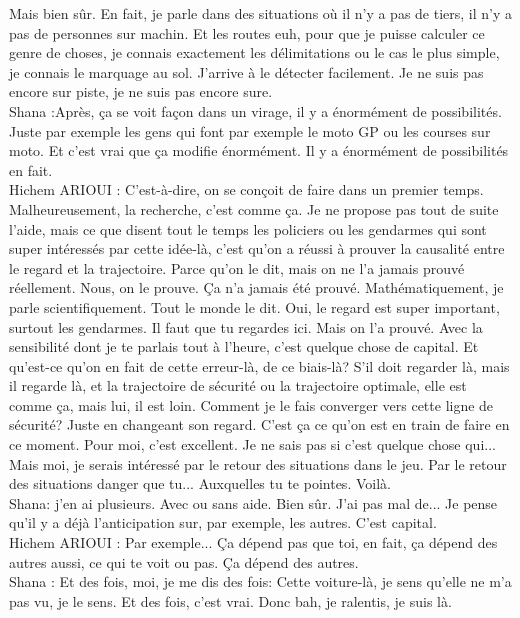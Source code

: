 Mais bien sûr. En fait, je parle dans des situations où il n'y a pas de tiers, il n'y a pas de personnes sur machin. Et les routes euh, pour que je puisse calculer ce genre de choses, je connais exactement les délimitations ou le cas le plus simple, je connais le marquage au sol. J'arrive à le détecter facilement. Je ne suis pas encore sur piste, je ne suis pas encore sure. \\
Shana :Après, ça se voit façon dans un virage, il y a énormément de possibilités. Juste par exemple les gens qui font par exemple le moto GP ou les courses sur moto. Et c'est vrai que ça modifie énormément. Il y a énormément de possibilités en fait.\\
Hichem ARIOUI : C'est-à-dire, on se conçoit de faire dans un premier temps. Malheureusement, la recherche, c'est comme ça. Je ne propose pas tout de suite l'aide, mais ce que disent tout le temps les policiers ou les gendarmes qui sont super intéressés par cette idée-là, c'est qu'on a réussi à prouver la causalité entre le regard et la trajectoire. Parce qu'on le dit, mais on ne l'a jamais prouvé réellement. Nous, on le prouve. Ça n'a jamais été prouvé. Mathématiquement, je parle scientifiquement. Tout le monde le dit. Oui, le regard est super important, surtout les gendarmes. Il faut que tu regardes ici. Mais on l'a prouvé. Avec la sensibilité dont je te parlais tout à l'heure, c'est quelque chose de capital. Et qu'est-ce qu'on en fait de cette erreur-là, de ce biais-là? S'il doit regarder là, mais il regarde là, et la trajectoire de sécurité ou la trajectoire optimale, elle est comme ça, mais lui, il est loin. Comment je le fais converger vers cette ligne de sécurité? Juste en changeant son regard. C'est ça ce qu'on est en train de faire en ce moment. Pour moi, c'est excellent. Je ne sais pas si c'est quelque chose qui... Mais moi, je serais intéressé par le retour des situations dans le jeu. Par le retour des situations danger que tu... Auxquelles tu te pointes. Voilà. \\
Shana: j'en ai plusieurs. Avec ou sans aide. Bien sûr. J'ai pas mal de... Je pense qu'il y a déjà l'anticipation sur, par exemple, les autres. 
C'est capital.\\
Hichem ARIOUI : Par exemple... Ça dépend pas que toi, en fait, ça dépend des autres aussi, ce qui te voit ou pas. Ça dépend des autres.\\
Shana : Et des fois, moi, je me dis des fois: Cette voiture-là, je sens qu'elle ne m'a pas vu, je le sens. Et des fois, c'est vrai. Donc bah, je ralentis, je suis là. \\
